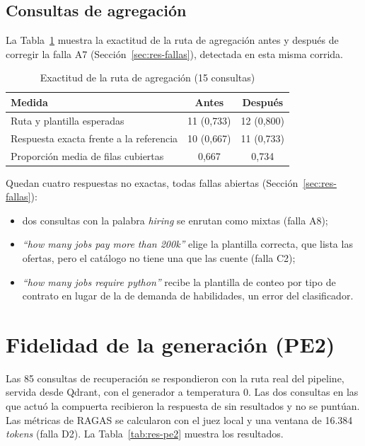 \subsection{Consultas de agregación}
\label{sec:res-agregacion}

La Tabla~\ref{tab:res-agregacion} muestra la exactitud de la ruta de agregación antes y después de corregir la falla A7 (Sección~\ref{sec:res-fallas}), detectada en esta misma corrida.

\begin{table}[htbp!]
    \centering
    \caption{Exactitud de la ruta de agregación (15 consultas)}
    \label{tab:res-agregacion}
    \begin{tabular}{|l|c|c|}
        \hline
        \textbf{Medida} & \textbf{Antes} & \textbf{Después} \\
        \hline
        Ruta y plantilla esperadas & 11 (0{,}733) & 12 (0{,}800) \\
        \hline
        Respuesta exacta frente a la referencia & 10 (0{,}667) & 11 (0{,}733) \\
        \hline
        Proporción media de filas cubiertas & 0{,}667 & 0{,}734 \\
        \hline
    \end{tabular}
\end{table}

Quedan cuatro respuestas no exactas, todas fallas abiertas (Sección~\ref{sec:res-fallas}):
\begin{itemize}
    \item dos consultas con la palabra \textit{hiring} se enrutan como mixtas (falla A8);
    \item \textit{\enquote{how many jobs pay more than 200k}} elige la plantilla correcta, que lista las ofertas, pero el catálogo no tiene una que las cuente (falla C2);
    \item \textit{\enquote{how many jobs require python}} recibe la plantilla de conteo por tipo de contrato en lugar de la de demanda de habilidades, un error del clasificador.
\end{itemize}

\section{Fidelidad de la generación (PE2)}
\label{sec:res-pe2}

Las 85 consultas de recuperación se respondieron con la ruta real del pipeline, servida desde Qdrant, con el generador a temperatura 0. Las dos consultas en las que actuó la compuerta recibieron la respuesta de sin resultados y no se puntúan. Las métricas de RAGAS se calcularon con el juez local y una ventana de 16.384 \textit{tokens} (falla D2). La Tabla~\ref{tab:res-pe2} muestra los resultados.

